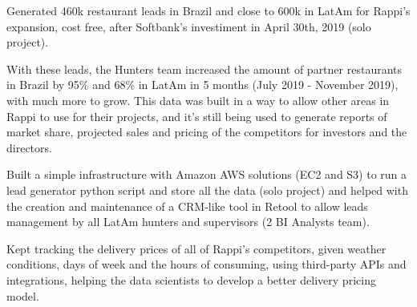 \documentclass[a4paper]{deedy-resume-openfont}
\begin{document}
\textbf{}
\begin{tightemize}
    \item Generated 460k restaurant leads in Brazil and close to 600k in LatAm for Rappi's expansion, cost free, after Softbank's investiment in April 30th, 2019 (solo project).
    \item With these leads, the Hunters team increased the amount of partner restaurants in Brazil by 95\% and 68\% in LatAm in 5 months (July 2019 - November 2019), with much more to grow. This data was built in a way to allow other areas in Rappi to use for their projects, and it's still being used to generate reports of market share, projected sales and pricing of the competitors for investors and the directors.
    \item Built a simple infrastructure with Amazon AWS solutions (EC2 and S3) to run a lead generator python script and store all the data (solo project) and helped with the creation and maintenance of a CRM-like tool in Retool to allow leads management by all LatAm hunters and supervisors (2 BI Analysts team).
    \item Kept tracking the delivery prices of all of Rappi's competitors, given weather conditions, days of week and the hours of consuming, using third-party APIs and integrations, helping the data scientists to develop a better delivery pricing model.
\end{tightemize}



    
\end{document}

